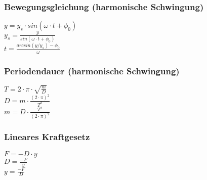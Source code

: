 \subsubsection{Bewegungsgleichung (harmonische Schwingung)} 
\begin{minipage}{0.45\textwidth} 
$ y = y_{s} \cdot sin(\omega \cdot t+\phi _{0} ) $\\ 
$ y_{s} = \frac{    y}{sin(\omega \cdot t+\phi _{0} )} $\\ 
$ t = \frac{arcsin(y/y_{s} )-\phi _{0} }{    \omega } $\\ 
\end{minipage} 
\begin{minipage}{0.45\textwidth} 
 
\end{minipage} 
\subsubsection{Periodendauer (harmonische Schwingung)} 
\begin{minipage}{0.45\textwidth} 
$ T = 2\cdot \pi \cdot \sqrt{\frac{m}{D}} $\\ 
$ D= m\cdot \frac{(2\cdot \pi )^{2} }{  T^{2} } $\\ 
$ m= D\cdot \frac{ T^{2} }{(2\cdot \pi )^{2} } $\\ 
\end{minipage} 
\begin{minipage}{0.45\textwidth} 
 
\end{minipage} 
\subsubsection{Lineares Kraftgesetz} 
\begin{minipage}{0.45\textwidth} 
$ F = -D\cdot y $\\ 
$ D = \frac{-F}{y} $\\ 
$ y = \frac{-F}{D} $\\ 
\end{minipage} 
\begin{minipage}{0.45\textwidth} 
 
\end{minipage} 
